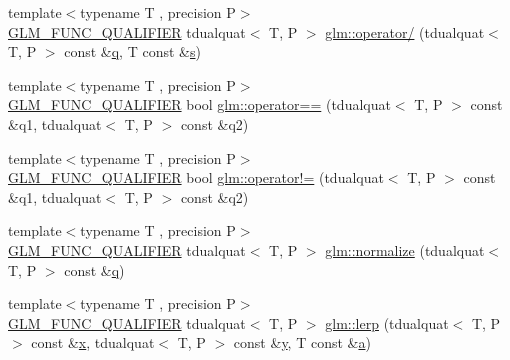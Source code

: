 \begin{DoxyCompactItemize}
\item 
{\footnotesize template$<$typename T , precision P$>$ }\\\mbox{\hyperlink{setup_8hpp_a33fdea6f91c5f834105f7415e2a64407}{G\+L\+M\+\_\+\+F\+U\+N\+C\+\_\+\+Q\+U\+A\+L\+I\+F\+I\+ER}} tdualquat$<$ T, P $>$ \mbox{\hyperlink{group__gtx__dual__quaternion_gad27b1d064624dd6ff1ecc205616323ba}{glm\+::operator/}} (tdualquat$<$ T, P $>$ const \&\mbox{\hyperlink{glad_8h_a514729309336df22bcc8eda979d6ced4}{q}}, T const \&\mbox{\hyperlink{glad_8h_af1b1d5edfea6a34daee7389b1b5810ad}{s}})
\item 
{\footnotesize template$<$typename T , precision P$>$ }\\\mbox{\hyperlink{setup_8hpp_a33fdea6f91c5f834105f7415e2a64407}{G\+L\+M\+\_\+\+F\+U\+N\+C\+\_\+\+Q\+U\+A\+L\+I\+F\+I\+ER}} bool \mbox{\hyperlink{group__gtx__dual__quaternion_ga732a51a3a2029f72dd381210e76a3082}{glm\+::operator==}} (tdualquat$<$ T, P $>$ const \&q1, tdualquat$<$ T, P $>$ const \&q2)
\item 
{\footnotesize template$<$typename T , precision P$>$ }\\\mbox{\hyperlink{setup_8hpp_a33fdea6f91c5f834105f7415e2a64407}{G\+L\+M\+\_\+\+F\+U\+N\+C\+\_\+\+Q\+U\+A\+L\+I\+F\+I\+ER}} bool \mbox{\hyperlink{group__gtx__dual__quaternion_ga5d256fb73497154924e2cf772411edef}{glm\+::operator!=}} (tdualquat$<$ T, P $>$ const \&q1, tdualquat$<$ T, P $>$ const \&q2)
\item 
{\footnotesize template$<$typename T , precision P$>$ }\\\mbox{\hyperlink{setup_8hpp_a33fdea6f91c5f834105f7415e2a64407}{G\+L\+M\+\_\+\+F\+U\+N\+C\+\_\+\+Q\+U\+A\+L\+I\+F\+I\+ER}} tdualquat$<$ T, P $>$ \mbox{\hyperlink{group__gtx__dual__quaternion_ga495818aa48c23e9e730f87a3c337d1d5}{glm\+::normalize}} (tdualquat$<$ T, P $>$ const \&\mbox{\hyperlink{glad_8h_a514729309336df22bcc8eda979d6ced4}{q}})
\item 
{\footnotesize template$<$typename T , precision P$>$ }\\\mbox{\hyperlink{setup_8hpp_a33fdea6f91c5f834105f7415e2a64407}{G\+L\+M\+\_\+\+F\+U\+N\+C\+\_\+\+Q\+U\+A\+L\+I\+F\+I\+ER}} tdualquat$<$ T, P $>$ \mbox{\hyperlink{group__gtx__dual__quaternion_ga8039b88397ca09275be924a26a806a59}{glm\+::lerp}} (tdualquat$<$ T, P $>$ const \&\mbox{\hyperlink{glad_8h_a92d0386e5c19fb81ea88c9f99644ab1d}{x}}, tdualquat$<$ T, P $>$ const \&\mbox{\hyperlink{glad_8h_a66ddd433d2cacfe27f5906b7e86faeed}{y}}, T const \&\mbox{\hyperlink{glad_8h_ac8729153468b5dcf13f971b21d84d4e5}{a}})
\item 

\end{DoxyCompactItemize}
